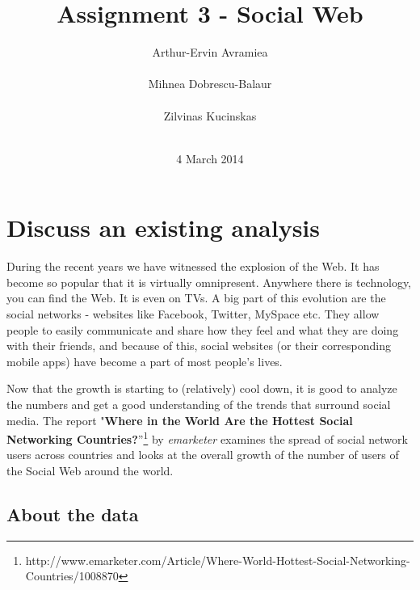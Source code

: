 \documentclass{acm_proc_10ptArticle-sp}
\begin{document}
\title{Assignment 3 - Social Web}

\author{
%
\alignauthor Arthur-Ervin Avramiea\\
       \\
\alignauthor Mihnea Dobrescu-Balaur\\
	\\
\alignauthor Zilvinas Kucinskas\\
	\\
}

\date{4 March 2014}
\maketitle

\section{Discuss an existing analysis}


During the recent years we have witnessed the explosion of the Web. It has become so popular that it is virtually omnipresent. Anywhere there is technology, you can find the Web. It is even on TVs. A big part of this evolution are the social networks - websites like Facebook, Twitter, MySpace etc. They allow people to easily communicate and share how they feel and what they are doing with their friends, and because of this, social websites (or their corresponding mobile apps) have become a part of most people's lives.

Now that the growth is starting to (relatively) cool down, it is good to analyze the numbers and get a good understanding of the trends that surround social media. The report "\textbf{Where in the World Are the Hottest Social Networking Countries?}”\footnote{http://www.emarketer.com/Article/Where-World-Hottest-Social-Networking-Countries/1008870} by \textit{emarketer} examines the spread of social network users across countries and looks at the overall growth of the number of users of the Social Web around the world.     

\subsection{About the data} 
\end{document}
